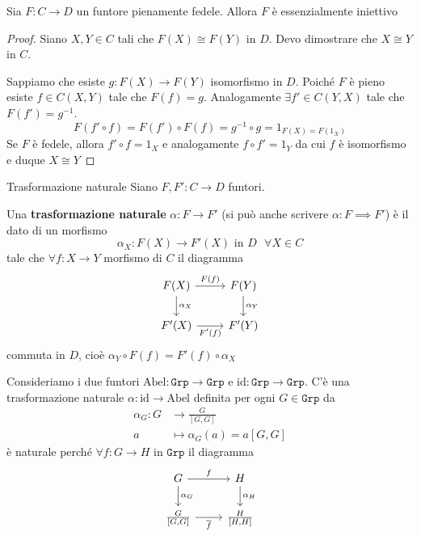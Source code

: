 \begin{proposition}{}
    Sia \(F: C \to D\) un funtore pienamente fedele. Allora \(F\) è
    essenzialmente iniettivo
\end{proposition}
\begin{proof}{}
    Siano \(X, Y \in C\) tali che \(F{(X)} \cong F{(Y)}\) in \(D\). Devo
    dimostrare che \(X \cong Y\) in \(C\).

    Sappiamo che esiste \(g : F{(X)} \to F{(Y)}\) isomorfismo in \(D\). Poiché
    \(F\) è pieno esiste \(f \in C{(X, Y)}\) tale che \(F{(f)} = g\).
    Analogamente \(\exists f' \in C{(Y, X)}\) tale che \(F{(f')} = g^{-1}\).
    \[
      F{(f' \circ f)} = F{(f')} \circ F{(f)} = g^{-1} \circ g = 1_{F{(X)} = F{(1_X)}} 
    \]
    Se \(F\) è fedele, allora \(f' \circ f = 1_X\)  e analogamente \(f \circ f' = 1_Y\) da cui \(f\) è isomorfismo e duque \(X \cong Y\) 
\end{proof}

\begin{definition}{Trasformazione naturale}
    Siano \(F, F' : C \to D\) funtori.

    Una \textbf{trasformazione naturale} \(\alpha : F \to F'\) (si può anche
    scrivere \(\alpha : F \implies F'\)) è il dato di un morfismo
    \[
      \alpha_X : F{(X)} \to F'{(X)} \text{ in \(D\) } \forall X \in C
    \]
    tale che \(\forall f : X \to Y\) morfismo di \(C\) il diagramma
\[\begin{tikzcd}
	{F(X)} & {F(Y)} \\
	{F'(X)} & {F'(Y)}
	\arrow["{F(f)}", from=1-1, to=1-2]
	\arrow["{\alpha_X}", from=1-1, to=2-1]
	\arrow["{\alpha_Y}", from=1-2, to=2-2]
	\arrow["{F'(f)}"', from=2-1, to=2-2]
\end{tikzcd}\]
    commuta in \(D\), cioè \(\alpha_Y \circ F{(f)} = F'{(f)} \circ \alpha_X\) 
\end{definition}

\begin{example}{}
    Consideriamo i due funtori \(\mathrm{Abel} : \mathtt{Grp} \to \mathtt{Grp}\) e \(\mathrm{id} : \mathtt{Grp} \to \mathtt{Grp}\). 
    C'è una trasformazione naturale \(\alpha : \mathrm{id} \to \mathrm{Abel}\)
    definita per ogni \(G \in \mathtt{Grp}\) da 
    \begin{align*}
        \alpha_G: G &\longrightarrow \frac{G}{[G, G]} \\
        a &\longmapsto \alpha_G(a) = a[G, G]
    \end{align*}
    è naturale perché \(\forall f : G \to H\) in \(\mathtt{Grp}\) il diagramma
\[\begin{tikzcd}
	{G} & {H} \\
    {\frac{G}{[G,G]}} & {\frac{H}{[H,H]}}
	\arrow["f", from=1-1, to=1-2]
	\arrow["{\alpha_G}", from=1-1, to=2-1]
	\arrow["{\alpha_H}", from=1-2, to=2-2]
	\arrow["\overline{f}"', from=2-1, to=2-2]
\end{tikzcd}\]
\end{example}

